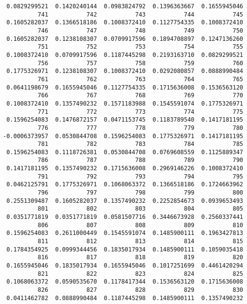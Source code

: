 \documentclass[
  letterpaper,
  DIV=11,
  numbers=noendperiod]{scrreprt}
\begin{document}
\begin{verbatim}
 0.0829299521  0.1420240144  0.0983824792  0.1396363667  0.1655945046 
          741           742           743           744           745 
 0.1605282037  0.1366518186  0.1008372410  0.1127754335  0.1008372410 
          746           747           748           749           750 
 0.1605282037  0.1238108307  0.0709917596  0.1894708897  0.1247136260 
          751           752           753           754           755 
 0.1008372410  0.0709917596  0.1187445298  0.2193163710  0.0829299521 
          756           757           758           759           760 
 0.1775326971  0.1238108307  0.1008372410  0.0292080857  0.0888990484 
          761           762           763           764           765 
 0.0641198679  0.1655945046  0.1127754335  0.1715636008  0.1536563120 
          766           767           768           769           770 
 0.1008372410  0.1357490232  0.1571183988  0.1545591074  0.1775326971 
          771           772           773           774           775 
 0.1596254083  0.1476872157  0.0471153745  0.1183789540  0.1417181195 
          776           777           778           779           780 
-0.0006373957  0.0530844708  0.1596254083  0.1775326971  0.1417181195 
          781           782           783           784           785 
 0.1596254083  0.1118726381  0.0530844708  0.0769608559  0.1125889347 
          786           787           788           789           790 
 0.1417181195  0.1357490232  0.1715636008  0.2969146226  0.1008372410 
          791           792           793           794           795 
 0.0462125791  0.1775326971  0.1068063372  0.1366518186  0.1724663962 
          796           797           798           799           800 
 0.2551309487  0.1605282037  0.1357490232  0.2252854673  0.0939653493 
          801           802           803           804           805 
 0.0351771819  0.0351771819  0.0581507716  0.3446673928  0.2560337441 
          806           807           808           809           810 
 0.1596254083  0.2611000449  0.1545591074  0.1485900111  0.1963427813 
          811           812           813           814           815 
 0.1784354925  0.0999344456  0.1835017934  0.1485900111  0.1059035418 
          816           817           818           819           820 
 0.1655945046  0.1835017934  0.1655945046  0.1017251699  0.4461420294 
          821           822           823           824           825 
 0.1068063372  0.0590535670  0.1178417344  0.1536563120  0.1715636008 
          826           827           828           829           830 
 0.0411462782  0.0888990484  0.1187445298  0.1485900111  0.1357490232 

\end{verbatim}
\end{document}
